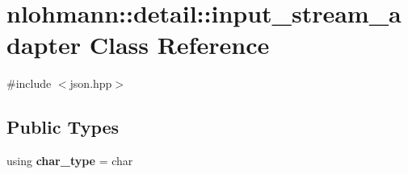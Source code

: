 \hypertarget{classnlohmann_1_1detail_1_1input__stream__adapter}{}\section{nlohmann\+:\+:detail\+:\+:input\+\_\+stream\+\_\+adapter Class Reference}
\label{classnlohmann_1_1detail_1_1input__stream__adapter}


{\ttfamily \#include $<$json.\+hpp$>$}

\subsection*{Public Types}
\begin{DoxyCompactItemize}
\item 
\mbox{\label{classnlohmann_1_1detail_1_1input__stream__adapter_a72f0713587f6bb3f3fbaae7d34c0ca39}} 
using {\bfseries char\+\_\+type} = char
\end{DoxyCompactItemize}
